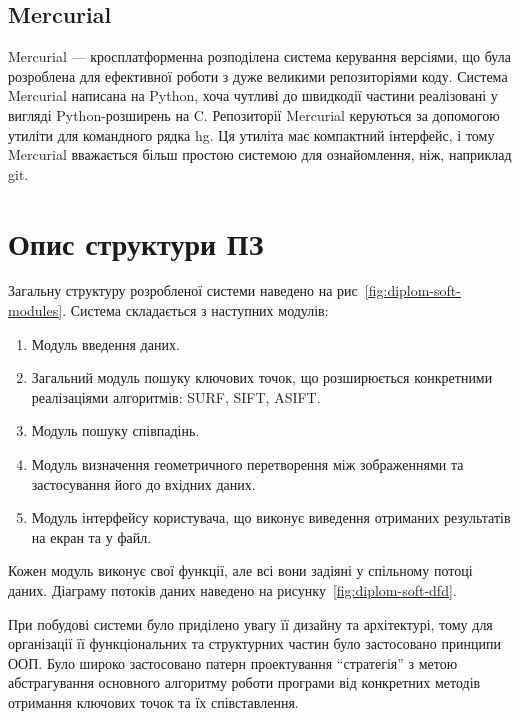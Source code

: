 \subsection{Mercurial}
Mercurial — кросплатформенна розподілена система керування версіями, що була розроблена для ефективної роботи з дуже великими репозиторіями коду. Система Mercurial написана на Python, хоча чутливі до швидкодії частини реалізовані у вигляді Python-розширень на C. Репозиторії Mercurial керуються за допомогою утиліти для командного рядка hg. Ця утиліта має компактний інтерфейс, і тому Mercurial вважається більш простою системою для ознайомлення, ніж, наприклад git.

\section{Опис структури ПЗ}

Загальну структуру розробленої системи наведено на рис~\ref{fig:diplom-soft-modules}. Система складається з наступних модулів:

\begin{enumerate}
  \item Модуль введення даних.
  \item Загальний модуль пошуку ключових точок, що розширюється конкретними реалізаціями алгоритмів: SURF, SIFT, ASIFT.
  \item Модуль пошуку співпадінь.
  \item Модуль визначення геометричного перетворення між зображеннями та застосування його до вхідних даних.
  \item Модуль інтерфейсу користувача, що виконує виведення отриманих результатів на екран та у файл.
\end{enumerate}


Кожен модуль виконує свої функції, але всі вони задіяні у спільному потоці даних. Діаграму потоків даних наведено на рисунку~\ref{fig:diplom-soft-dfd}. 


При побудові системи було приділено увагу її дизайну та архітектурі, тому для організації її функціональних та структурних частин було застосовано принципи ООП. Було широко застосовано патерн проектування ``стратегія'' з метою абстрагування основного алгоритму роботи програми від конкретних методів отримання ключових точок та їх співставлення. 

